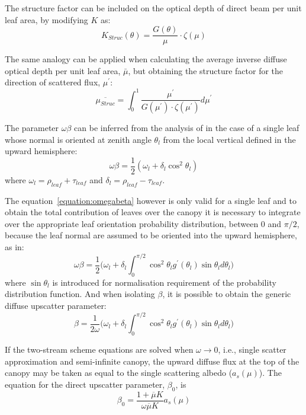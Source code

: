 \documentclass[a4paper,11pt]{report}
\begin{document}
The structure factor can be included on the optical depth of direct beam per unit leaf area, by modifying $K$ as:
\begin{equation}
K_{Struc}(\theta) = \frac{G(\theta)}{\mu} \cdot  \zeta(\mu)
\label{equation:opticaldepthstruct}
\end{equation}

The same analogy can be applied when calculating the average inverse diffuse optical depth per unit leaf area, $\bar{\mu}$, but obtaining the structure factor for the direction of scattered flux, $\mu^\prime$:
\begin{equation}
\overline{\mu_{Struc}} = \int_{0}^{1} \frac{\mu^\prime}{G(\mu^\prime) \cdot \zeta(\mu^\prime)} d\mu^\prime
\label{equation:muprimestruct}
\end{equation}

The parameter $\omega\beta$ can be inferred from the analysis of \citet{Norman1975} in the case of a single leaf whose normal is oriented at zenith angle $\theta_l$ from the local vertical defined in the upward hemisphere:
\begin{equation}
\omega\beta = \frac{1}{2}(\omega_l + \delta_l \cos^2 \theta_l)
\label{equation:omegabeta}
\end{equation}
\noindent where $\omega_l = \rho_{leaf} + \tau_{leaf}$ and $\delta_l = \rho_{leaf} - \tau_{leaf}$. 

The equation~\ref{equation:omegabeta} however is only valid for a single leaf and to obtain the total contribution of leaves over the canopy it is necessary to integrate over the appropriate leaf orientation probability distribution, between 0 and $\pi/2$, because the leaf normal are assumed to be oriented into the upward hemisphere, as in:
\begin{equation}
\omega\beta = \frac{1}{2}\Big(\omega_l + \delta_l \int_{0}^{\pi/2} \cos^2 \theta_l g^\prime(\theta_l) \sin \theta_l d\theta_l\Big)
\label{equation:omegabeta2}
\end{equation}
\noindent where $\sin\theta_l$ is introduced for normalisation requirement of the probability distribution function. And when isolating $\beta$, it is possible to obtain the generic diffuse upscatter parameter:
\begin{equation}
\beta = \frac{1}{2\omega}\Big(\omega_l + \delta_l \int_{0}^{\pi/2} \cos^2 \theta_l g^\prime(\theta_l) \sin \theta_l d\theta_l\Big)
\label{equation:beta}
\end{equation}

If the two-stream scheme equations are solved when $\omega \rightarrow 0$, i.e., single scatter approximation and semi-infinite canopy, the upward diffuse flux at the top of the canopy may be taken as equal to the single scattering albedo ($a_s(\mu)$). The equation for the direct upscatter parameter, $\beta_0$, is
\begin{equation}
\beta_0 = \frac{1 + \overline{\mu}K}{\omega\overline{\mu}K}a_s(\mu)
\label{equation:betazero}
\end{equation}
\end{document}

